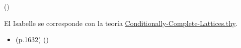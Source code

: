 \begin{isabellebody}
\begin{isamarkuptext}
\begin{itemize}
      \hfill ()
  \end{itemize}%
\end{isamarkuptext}\isamarkuptrue%
%
\isadelimdocument
%
\endisadelimdocument
%
\isatagdocument
%
\isamarkuptrue%
%
\endisatagdocument
{\isafolddocument}%
%
\isadelimdocument
%
\endisadelimdocument
%
\begin{isamarkuptext}%
El Isabelle se corresponde con la teoría 
  \href{https://acortar.link/1suGL}{Conditionally-Complete-Lattices.thy}.%
\end{isamarkuptext}\isamarkuptrue%
%
\begin{isamarkuptext}%
\begin{itemize}
    \item (p.1632)  
      \hfill ()
  \end{itemize}%
\end{isamarkuptext}\isamarkuptrue%
%
\isadelimtheory
%
\endisadelimtheory
%
\isatagtheory
%
\endisatagtheory
{\isafoldtheory}%
%
\isadelimtheory
%
\endisadelimtheory
%
\end{isabellebody}%
\endinput
